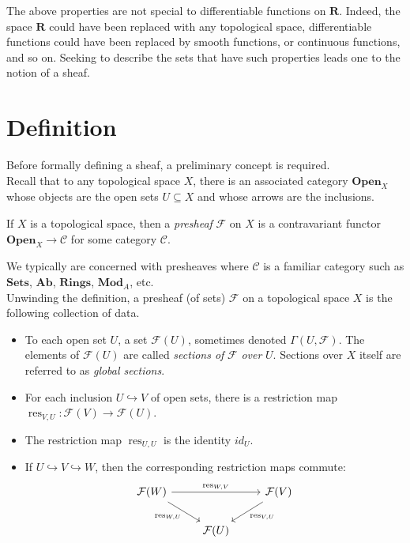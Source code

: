 \documentclass[11pt,openany]{book} %
\newcommand{\R}{\mathbf{R}}
\begin{document}
The above properties are not special to differentiable functions on $\R$. Indeed, the space $\R$ could have been replaced with any topological space, differentiable functions could have been replaced by smooth functions, or continuous functions, and so on. Seeking to describe the sets that have such properties leads one to the notion of a sheaf.


\section{Definition}

Before formally defining a sheaf, a preliminary concept is required.\\

Recall that to any topological space $X$, there is an associated category $\mathbf{Open}_X$ whose objects are the open sets $U \subseteq X$ and whose arrows are the inclusions.\\

\begin{definition}
If $X$ is a topological space, then a \emph{presheaf} $\mathcal{F}$ on $X$ is a contravariant functor $\mathbf{Open}_X \to \mathcal{C}$ for some category $\mathcal{C}$.
\end{definition}

We typically are concerned with presheaves where $\mathcal{C}$ is a familiar category such as $\mathbf{Sets}$, $\mathbf{Ab}$, $\mathbf{Rings}$, $\mathbf{Mod}_A$, etc.\\ 

Unwinding the definition, a presheaf (of sets) $\mathcal{F}$ on a topological space $X$ is the following collection of data.\\

\begin{itemize}
	\item To each open set $U$, a set $\mathcal{F}(U)$, sometimes denoted $\Gamma(U,\mathcal{F})$. The elements of $\mathcal{F}(U)$ are called \emph{sections of} $\mathcal{F}$ \emph{over} $U$. Sections over $X$ itself are referred to as \emph{global sections}.
    \item For each inclusion $U \hookrightarrow V$ of open sets, there is a restriction map $\operatorname{res}_{V,U} : \mathcal{F}(V) \to \mathcal{F}(U)$.
    \item The restriction map $\operatorname{res}_{U,U}$ is the identity $id_U$.
    \item If $U \hookrightarrow V \hookrightarrow W$, then the corresponding restriction maps commute:
    \[
    \begin{tikzcd}
    	\mathcal{F}(W) \ar[rr, "\operatorname{res}_{W,V}"] \ar[rd, swap, "\operatorname{res}_{W,U}"] & & \mathcal{F}(V) \ar[ld, "\operatorname{res}_{V,U}"]\\
        	& \mathcal{F}(U)
    \end{tikzcd}
    \]
\end{itemize}
\hfill
\end{document}
